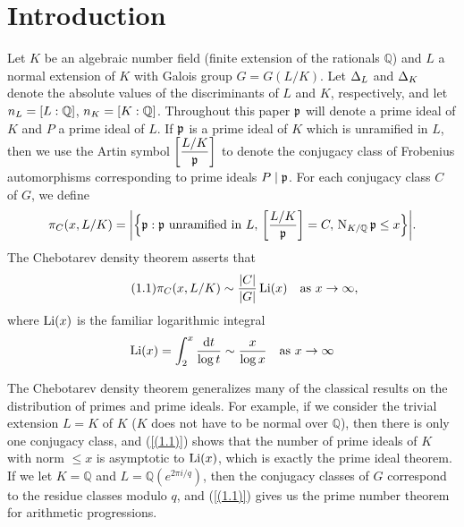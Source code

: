 \documentclass[./main]{subfiles}
\begin{document}
\section{Introduction}

Let $K$ be an algebraic number field (finite extension of the rationals $\mathbb Q$) and $L$ a normal extension of $K$ with Galois group $G = G(L/K)$. Let $\Delta_L$ and $\Delta_K$ denote the absolute values of the discriminants of $L$ and $K$, respectively, and let $n_L = [L:\mathbb{Q}]$, $n_K = [K:\mathbb{Q}]$. Throughout this paper $\mathfrak{p}$ will denote a prime ideal of $K$ and $P$ a prime ideal of $L$. If $\mathfrak{p}$ is a prime ideal of $K$ which is unramified in $L$, then we use the Artin symbol $\bigg[\dfrac{L/K}{\mathfrak p}\bigg]$ to denote the conjugacy class of Frobenius automorphisms corresponding to prime ideals $P\mid \mathfrak{p}$. For each conjugacy class $C$ of $G$, we define
\[ \pi_C (x, L/K) = \bigg\vert \Big\{\mathfrak{p} : \mathfrak{p} \text{ unramified in } L,\, \bigg[\dfrac{L/K}{\mathfrak{p}}\bigg] = C,\, \operatorname{N}_{K/\mathbb{Q}}\mathfrak{p} \le x \Big\} \bigg\vert. \]
The Chebotarev density theorem \cite{15-Tschebotareff1926} asserts that
\[\tag{1.1}\label{(1.1)} \pi_C (x, L/K) \sim \frac{|C|}{|G|} \operatorname{Li}(x) \hspace{1em} \text{as } x\to\infty, \]
where $\operatorname{Li}(x)$ is the familiar logarithmic integral
\[ \operatorname{Li}(x) = \int_2^x \frac{\mathrm{d} t}{\log t} \sim \frac{x}{\log x} \hspace{1em}\text{as }x\to\infty \]

The Chebotarev density theorem generalizes many of the classical results on the distribution of primes and prime ideals. For example, if we consider the trivial extension $L = K$ of $K$ ($K$ does not have to be normal over $\mathbb Q$), then there is only one conjugacy class, and (\ref{(1.1)}) shows that the number of prime ideals of $K$ with norm $\le x$ is asymptotic to $\operatorname{Li}(x)$, which is exactly the prime ideal theorem. If we let $K = \mathbb Q$ and $L = \mathbb Q(e^{2\pi i/q})$, then the conjugacy classes of $G$ correspond to the residue classes modulo $q$, and (\ref{(1.1)}) gives us the prime number theorem for arithmetic progressions.
\end{document}
